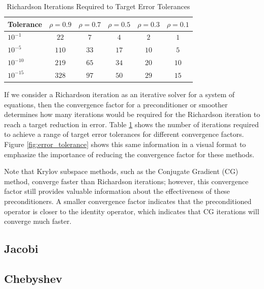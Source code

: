 \begin{table}[ht!]
\begin{center}
\begin{tabular}{l c c c c c}
  \toprule
  Tolerance   &  $\rho = 0.9$  &  $\rho = 0.7$  &  $\rho = 0.5$  &  $\rho = 0.3$  &  $\rho = 0.1$  \\
  \toprule
  $10^{-1}$   &  $22$          &  $7$           &  $4$           & $2$            &  $1$           \\
  $10^{-5}$   &  $110$         &  $33$          &  $17$          & $10$           &  $5$           \\
  $10^{-10}$  &  $219$         &  $65$          &  $34$          & $20$           &  $10$          \\
  $10^{-15}$  &  $328$         &  $97$          &  $50$          & $29$           &  $15$          \\
  \bottomrule
\end{tabular}
\end{center}
\caption{Richardson Iterations Required to Target Error Tolerances}
\label{table:error_tolerance}
\end{table}

If we consider a Richardson iteration as an iterative solver for a system of equations, then the convergence factor for a preconditioner or smoother determines how many iterations would be required for the Richardson iteration to reach a target reduction in error.
Table \ref{table:error_tolerance} shows the number of iterations required to achieve a range of target error tolerances for different convergence factors.
Figure \ref{fig:error_tolerance} shows this same information in a visual format to emphasize the importance of reducing the convergence factor for these methods.

Note that Krylov subspace methods, such as the Conjugate Gradient (CG) method, converge faster than Richardson iterations; however, this convergence factor still provides valuable information about the effectiveness of these preconditioners.
A smaller convergence factor indicates that the preconditioned operator is closer to the identity operator, which indicates that CG iterations will converge much faster.

\subsection{Jacobi}


\subsection{Chebyshev}
